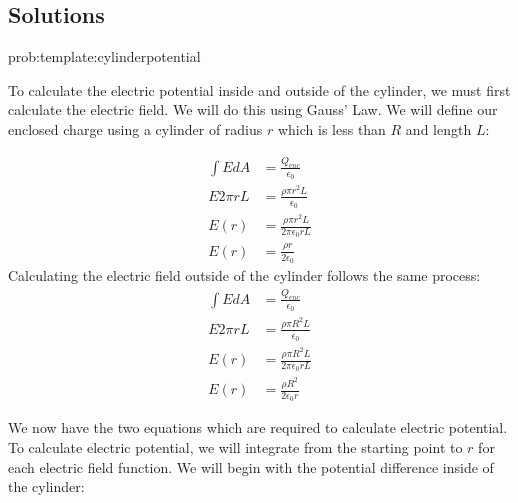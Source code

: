 \subsection{Solutions}
\begin{solution}{prob:template:cylinderpotential}\label{soln:template:cylinderpotential}

	To calculate the electric potential inside and outside of the cylinder, we must first calculate the electric field. We will do this using Gauss' Law. We will define our enclosed charge using a cylinder of radius $r$ which is less than $R$ and length $L$:
	
	\begin{align*}
	\int E dA & = \frac{Q_{enc}}{\epsilon_0}\\
	E 2\pi rL &= \frac{\rho \pi r^2 L}{\epsilon_0}\\
	E(r)& = \frac{\rho \pi r^2 L}{2\pi \epsilon_0 r L}\\
	E(r)&= \frac{\rho r}{2\epsilon_0}
	\end{align*}
	Calculating the electric field outside of the cylinder follows the same process:
	\begin{align*}
	\int E dA & = \frac{Q_{enc}}{\epsilon_0}\\
	E 2\pi rL &= \frac{\rho \pi R^2 L}{\epsilon_0}\\
	E(r)& = \frac{\rho \pi R^2 L}{2\pi \epsilon_0 r L}\\
	E(r)&= \frac{\rho R^2}{2\epsilon_0 r}
	\end{align*}
	
	We now have the two equations which are required to calculate electric potential. To calculate electric potential, we will integrate from the starting point to $r$ for each electric field function. We will begin with the potential difference inside of the cylinder:
	

\end{solution}
